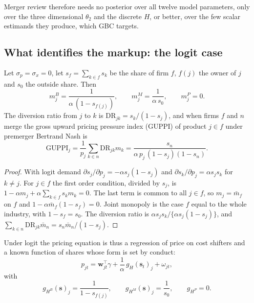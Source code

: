 Merger review therefore needs no posterior over all twelve model parameters, only over the three dimensional $\theta_2$ and the discrete $H$, or better, over the few scalar estimands they produce, which GBC targets.

\subsection{What identifies the markup: the logit case}

\begin{lemma}\label{blp:lem:logit}
Let $\sigma_p=\sigma_x=0$, let $s_f = \sum_{k\in f}s_k$ be the share of firm $f$, $f(j)$ the owner
of $j$ and $s_0$ the outside share. Then
\begin{equation}\label{blp:eq:logitmarkups}
  m_j^{B} = \frac{1}{\alpha\,(1-s_{f(j)})},\qquad
  m_j^{M} = \frac{1}{\alpha\, s_0},\qquad
  m_j^{P} = 0 .
\end{equation}
The diversion ratio from $j$ to $k$ is $\mathrm{DR}_{jk} = s_k/(1-s_j)$, and when firms $f$ and $n$ merge
the gross upward pricing pressure index (GUPPI) of product $j\in f$ under premerger Bertrand Nash is
\[
\mathrm{GUPPI}_j = \frac{1}{p_j}\sum_{k\in n} \mathrm{DR}_{jk}m_k = \frac{s_n}{\alpha\,p_j\,(1-s_j)(1-s_n)} .
\]
\end{lemma}
\begin{proof}
With logit demand $\partial s_j/\partial p_j = -\alpha s_j(1-s_j)$ and
$\partial s_k/\partial p_j = \alpha s_js_k$ for $k\neq j$. For $j\in f$ the first order condition,
divided by $s_j$, is $1 - \alpha m_j + \alpha\sum_{k\in f}s_k m_k = 0$. The last term is common to
all $j\in f$, so $m_j = \bar m_f$ on $f$ and $1 - \alpha\bar m_f(1-s_f) = 0$. Joint monopoly is the
case $f$ equal to the whole industry, with $1-s_f = s_0$. The diversion ratio is
$\alpha s_js_k/\{\alpha s_j(1-s_j)\}$, and $\sum_{k\in n}\mathrm{DR}_{jk}\bar m_n = s_n\bar m_n/(1-s_j)$.
\end{proof}

Under logit the pricing equation is thus a regression of price on cost shifters and a known
function of shares whose form is set by conduct:
\begin{equation}\label{blp:eq:markupreg}
  p_{jt} = \bm w_{jt}^\top\gamma + \frac{1}{\alpha}\,g_H(\bm s_t)_j + \omega_{jt},
\end{equation}
with
\[
  g_{H^B}(\bm s)_j = \frac{1}{1-s_{f(j)}},\qquad g_{H^M}(\bm s)_j = \frac{1}{s_0},\qquad g_{H^P}=0.
\]


